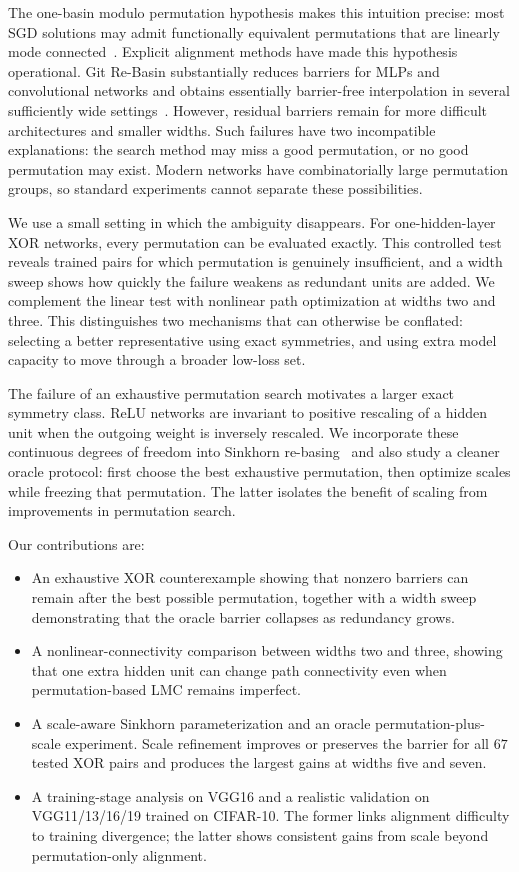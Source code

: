 \documentclass{article}
\begin{document}
The one-basin modulo permutation hypothesis makes this intuition precise: most
SGD solutions may admit functionally equivalent permutations that are linearly
mode connected~\citep{entezari2021role}.  Explicit alignment methods have made
this hypothesis operational.  Git Re-Basin substantially reduces barriers for
MLPs and convolutional networks and obtains essentially barrier-free
interpolation in several sufficiently wide settings~\citep{ainsworth2023git}.
However, residual barriers remain for more difficult architectures and smaller
widths.  Such failures have two incompatible explanations: the search method
may miss a good permutation, or no good permutation may exist.  Modern networks
have combinatorially large permutation groups, so standard experiments cannot
separate these possibilities.

We use a small setting in which the ambiguity disappears.  For one-hidden-layer
XOR networks, every permutation can be evaluated exactly.  This controlled
test reveals trained pairs for which permutation is genuinely insufficient,
and a width sweep shows how quickly the failure weakens as redundant units are
added.  We complement the linear test with nonlinear path optimization at
widths two and three.  This distinguishes two mechanisms that can otherwise be
conflated: selecting a better representative using exact symmetries, and using
extra model capacity to move through a broader low-loss set.

The failure of an exhaustive permutation search motivates a larger exact
symmetry class.  ReLU networks are invariant to positive rescaling of a hidden
unit when the outgoing weight is inversely rescaled.  We incorporate these
continuous degrees of freedom into Sinkhorn re-basing~\citep{guerrero2023rebasin}
and also study a cleaner oracle protocol: first choose the best exhaustive
permutation, then optimize scales while freezing that permutation.  The latter
isolates the benefit of scaling from improvements in permutation search.

Our contributions are:
\begin{itemize}
    \item An exhaustive XOR counterexample showing that nonzero barriers can
    remain after the best possible permutation, together with a width sweep
    demonstrating that the oracle barrier collapses as redundancy grows.
    \item A nonlinear-connectivity comparison between widths two and three,
    showing that one extra hidden unit can change path connectivity even when
    permutation-based LMC remains imperfect.
    \item A scale-aware Sinkhorn parameterization and an oracle
    permutation-plus-scale experiment.  Scale refinement improves or preserves
    the barrier for all $67$ tested XOR pairs and produces the largest gains at
    widths five and seven.
    \item A training-stage analysis on VGG16 and a realistic validation on
    VGG11/13/16/19 trained on CIFAR-10.  The former links alignment difficulty
    to training divergence; the latter shows consistent gains from scale beyond
    permutation-only alignment.
\end{itemize}
\end{document}
